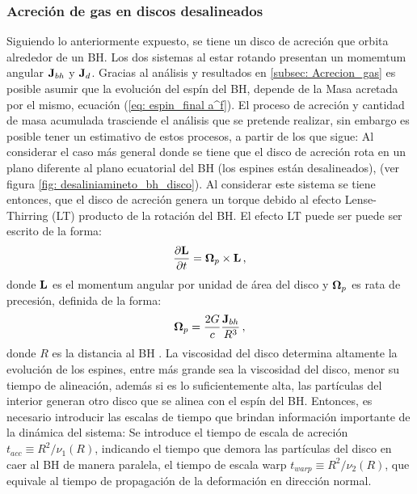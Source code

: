    \subsubsection{Acreción de gas en discos desalineados}
    \label{subsubsec: Acrecion gas desaliniado}
Siguiendo lo anteriormente expuesto, se tiene un disco de acreción que orbita alrededor de un BH. Los dos sistemas al estar rotando presentan un momemtum angular ${\bf{J}}_{bh}$ y ${\bf{J}}_{d}$. Gracias al análisis y resultados en \ref{subsec: Acrecion_gas} es posible asumir que la evolución del espín del BH, depende de la Masa acretada por el mismo, ecuación (\ref{eq: espin_final a^f}). El proceso de acreción y cantidad de masa acumulada trasciende el análisis que se pretende realizar, sin embargo es posible tener un estimativo de estos procesos, a partir de los que sigue: Al considerar el caso más general donde se tiene que el disco de acreción rota en un plano diferente al plano ecuatorial del BH (los espines están desalineados), (ver figura \ref{fig: desaliniamineto_bh_disco}). Al considerar este sistema se tiene entonces, que el disco de acreción genera un torque debido al efecto Lense-Thirring (LT) producto de la rotación del BH. El efecto LT puede ser puede ser escrito de la forma:
%
\begin{align}
    \frac{\partial {\bf{L}}}{\partial t}={\bf{\Omega}}_{p}\times{\bf{L}}\,,
    \label{eq: lense-Thirring}
\end{align}
%
donde ${\bf{L}}$ es el momentum angular por unidad de área del disco y ${\bf{\Omega}}_{p}$ es rata de precesión, definida de la forma:
%
\begin{align}
    {\bf{\Omega}}_{p}=\frac{2G}{c}\frac{{\bf{J}}_{bh}}{R^{3}}\,,
\end{align}
%
donde $R$ es la distancia al BH \cite{pringle1992}. La viscosidad del disco determina altamente la evolución de los espines, entre más grande sea la viscosidad del disco, menor su tiempo de alineación, además si es lo suficientemente alta, las partículas del interior generan otro disco que se alinea con el espín del BH. Entonces, es necesario introducir las escalas de tiempo que brindan información importante de la dinámica del sistema: Se introduce el tiempo de escala de acreción $t_{acc}\equiv R^{2}/\nu_{1}(R)$, indicando el tiempo que demora las partículas del disco en caer al BH de manera paralela, el tiempo de escala warp $t_{warp}\equiv R^{2}/\nu_{2}(R)$, que equivale al tiempo de propagación de la deformación en dirección normal.  

